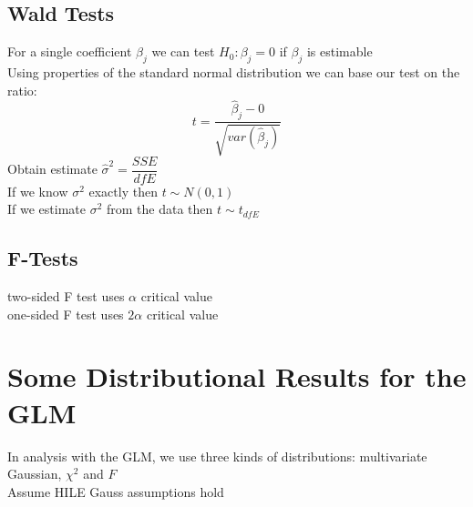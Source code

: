\documentclass[openany]{book}
\newcommand{\B}{\beta}
\newcommand{\sg}{\sigma}
\newcommand{\hb}{\hat{\beta}}
\numberwithin{equation}{section}
\begin{document}
\begin{flushleft}
\section{Wald Tests}
For a single coefficient $\B_j$ we can test $H_0:\B_j=0$ if $\B_j$ is estimable\\
Using properties of the standard normal distribution we can base our test on the ratio:
\[t=\dfrac{\hb_j-0}{\sqrt{var(\hb_j)}}
\]
Obtain estimate $\hat{\sg}^2=\dfrac{SSE}{dfE}$\\
If we know $\sigma^2$ exactly then $t\sim N(0,1)$\\
If we estimate $\sg^2$ from the data then $t\sim t_{dfE}$\\
\section{F-Tests}
two-sided F test uses $\alpha$ critical value\\
one-sided F test uses $2\alpha$ critical value\\
\chapter{Some Distributional Results for the GLM}
In analysis with the GLM, we use three kinds of distributions:
multivariate Gaussian, $\chi^2$ and $F$\\
Assume HILE Gauss assumptions hold

\end{flushleft}
\end{document}

